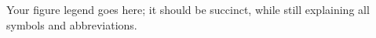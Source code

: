 \label{fig:your-figure}Your figure legend goes here; it should be succinct, while still explaining all symbols and abbreviations. 